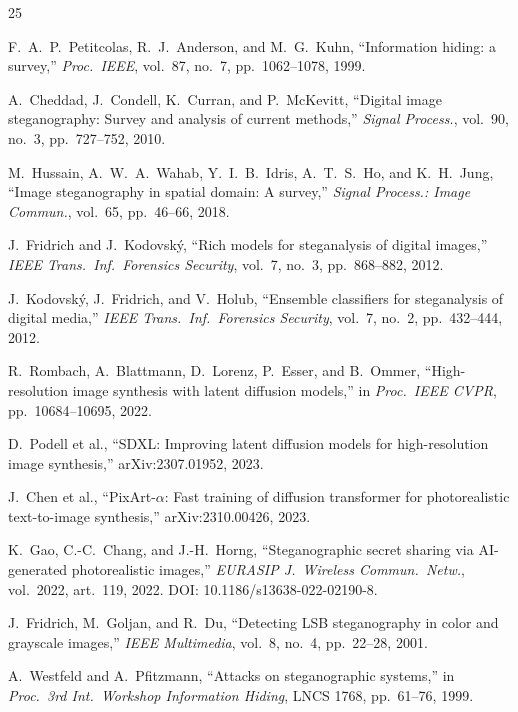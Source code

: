 \documentclass[10pt,twocolumn,a4paper]{article}
\begin{document}
\begin{thebibliography}{25}
\small

F.~A.~P.~Petitcolas, R.~J.~Anderson, and M.~G.~Kuhn,
``Information hiding: a survey,''
\textit{Proc.\ IEEE}, vol.~87, no.~7, pp.~1062--1078, 1999.

A.~Cheddad, J.~Condell, K.~Curran, and P.~McKevitt,
``Digital image steganography: Survey and analysis of current methods,''
\textit{Signal Process.}, vol.~90, no.~3, pp.~727--752, 2010.

M.~Hussain, A.~W.~A.~Wahab, Y.~I.~B.~Idris, A.~T.~S.~Ho, and K.~H.~Jung,
``Image steganography in spatial domain: A survey,''
\textit{Signal Process.: Image Commun.}, vol.~65, pp.~46--66, 2018.

J.~Fridrich and J.~Kodovsk\'{y},
``Rich models for steganalysis of digital images,''
\textit{IEEE Trans.\ Inf.\ Forensics Security}, vol.~7, no.~3, pp.~868--882, 2012.

J.~Kodovsk\'{y}, J.~Fridrich, and V.~Holub,
``Ensemble classifiers for steganalysis of digital media,''
\textit{IEEE Trans.\ Inf.\ Forensics Security}, vol.~7, no.~2, pp.~432--444, 2012.

R.~Rombach, A.~Blattmann, D.~Lorenz, P.~Esser, and B.~Ommer,
``High-resolution image synthesis with latent diffusion models,''
in \textit{Proc.\ IEEE CVPR}, pp.~10684--10695, 2022.

D.~Podell et al.,
``SDXL: Improving latent diffusion models for high-resolution image synthesis,''
arXiv:2307.01952, 2023.

J.~Chen et al.,
``PixArt-$\alpha$: Fast training of diffusion transformer for photorealistic text-to-image synthesis,''
arXiv:2310.00426, 2023.

K.~Gao, C.-C.~Chang, and J.-H.~Horng,
``Steganographic secret sharing via AI-generated photorealistic images,''
\textit{EURASIP J.\ Wireless Commun.\ Netw.}, vol.~2022, art.~119, 2022.
DOI: 10.1186/s13638-022-02190-8.

J.~Fridrich, M.~Goljan, and R.~Du,
``Detecting LSB steganography in color and grayscale images,''
\textit{IEEE Multimedia}, vol.~8, no.~4, pp.~22--28, 2001.

A.~Westfeld and A.~Pfitzmann,
``Attacks on steganographic systems,''
in \textit{Proc.\ 3rd Int.\ Workshop Information Hiding}, LNCS 1768, pp.~61--76, 1999.


\end{thebibliography}
\end{document}
